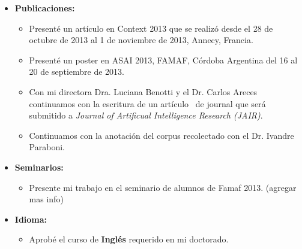 \begin{itemize}
\item \textbf{Publicaciones:} 
\begin{itemize}
\item Present\'e un art\'iculo en Context 2013 que se realiz\'o desde el 28 de octubre de 2013 al 1 de noviembre de 2013, Annecy, Francia.
\item Present\'e un poster en ASAI 2013, FAMAF, C\'ordoba Argentina del 16 al 20 de septiembre de 2013.
\item Con mi directora Dra. Luciana Benotti y el Dr. Carlos Areces continuamos con la escritura de un art\'iculo~\cite{benotti-altamirano-jair} de journal que ser\'a submitido a \emph{Journal of Artificual Intelligence Research (JAIR)}.
\item Continuamos con la anotaci\'on del corpus recolectado con el Dr. Ivandre Paraboni.
\end{itemize}

\item \textbf{Seminarios:}
\begin{itemize}
\item Presente mi trabajo en el seminario de alumnos de Famaf 2013. (agregar mas info)
\end{itemize}
\item \textbf{Idioma:}
\begin{itemize}
\item Aprob\'e el curso de \textbf{Ingl\'es} requerido en mi doctorado.


\end{itemize}
\end{itemize}
